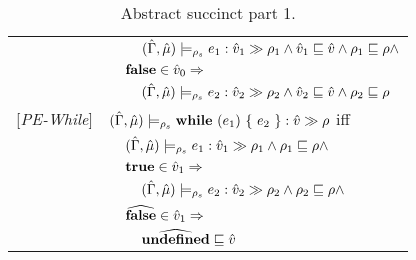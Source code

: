 \begin{table}[tlb]
\begin{tabular}{l l l l}
&&&$(\hat{\Gamma},\hat{\mu}) \models_{\rho_s} e_1 : \hat{v}_{1} \gg \rho_{1} \wedge \hat{v}_1 \sqsubseteq \hat{v} \wedge \rho_1 \sqsubseteq \rho \wedge$ \\
&&\multicolumn{2}{l}{$\mathbf{\mathbf{false}} \in \hat{v}_0 \Rightarrow$}\\
&&&$(\hat{\Gamma},\hat{\mu}) \models_{\rho_s} e_2 : \hat{v}_{2} \gg \rho_{2} \wedge \hat{v}_2 \sqsubseteq \hat{v} \wedge \rho_2 \sqsubseteq \rho$ \\
{[\textit{PE-While}]}&\multicolumn{3}{l}{$(\hat{\Gamma},\hat{\mu}) \models_{\rho_s} \mathbf{while}\ (e_1)\ \{\ e_2\ \} : \hat{v} \gg \rho $ iff}\\
&&\multicolumn{2}{l}{$(\hat{\Gamma},\hat{\mu}) \models_{\rho_s} e_1 : \hat{v}_{1} \gg \rho_{1} \wedge \rho_1 \sqsubseteq \rho \wedge$}\\
&&\multicolumn{2}{l}{$\mathbf{\mathbf{true}} \in \hat{v}_1 \Rightarrow$}\\
&&&$(\hat{\Gamma},\hat{\mu}) \models_{\rho_s} e_2 : \hat{v}_{2} \gg \rho_{2} \wedge \rho_2 \sqsubseteq \rho \wedge$\\ %
&&\multicolumn{2}{l}{$\widehat{\mathbf{false}} \in \hat{v}_1 \Rightarrow$}\\
&&&$\widehat{\mathbf{undefined}} \sqsubseteq \hat{v}$\\
\end{tabular}
\caption{Abstract succinct part 1.}
\label{tab:AbstSucc1}
\end{table}
